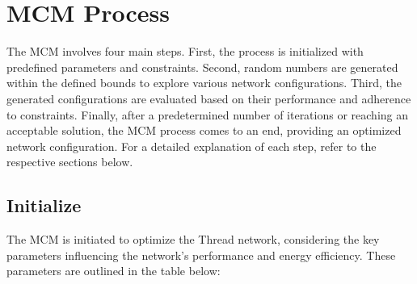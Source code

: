 \section{\texorpdfstring{\acrlong{MCM}}{MCM} Process}\label{sec:monte_carlo_method_process}

The \gls{MCM} involves four main steps. First, the process is initialized with predefined parameters and constraints. Second, random numbers are generated within the defined bounds to explore various network configurations. Third, the generated configurations are evaluated based on their performance and adherence to constraints. Finally, after a predetermined number of iterations or reaching an acceptable solution, the \gls{MCM} process comes to an end, providing an optimized network configuration. For a detailed explanation of each step, refer to the respective sections below.

\subsection{Initialize}

The \gls{MCM} is initiated to optimize the Thread network, considering the key parameters influencing the network's performance and energy efficiency. These parameters are outlined in the table below:

